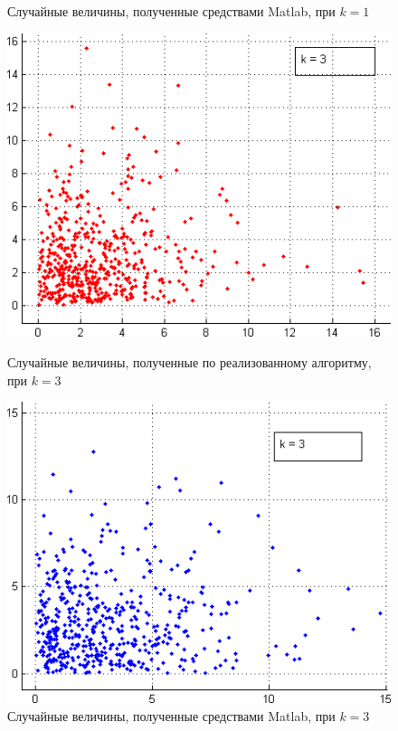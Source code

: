 \begin{figure}[h!]
\begin{minipage}[h!]{0.47\linewidth}
    \caption{Случайные величины, полученные средствами Matlab,
      при $ k = 1 $
    }
  \end{minipage}
\end{figure}

\begin{figure}[h!]
  \begin{minipage}[h!]{0.47\linewidth}
    \includegraphics[width=1\linewidth]{pic/hi_our_3}
    \caption{Случайные величины, полученные по реализованному алгоритму,
      при $ k = 3 $
  }
  \end{minipage}
  \hfill
  \begin{minipage}[h!]{0.47\linewidth}
    \vspace{4mm}
    \includegraphics[width=1\linewidth]{pic/hi_matlab_3}
    \caption{Случайные величины, полученные средствами Matlab,
      при $ k = 3 $
    }
  \end{minipage}
\end{figure}

